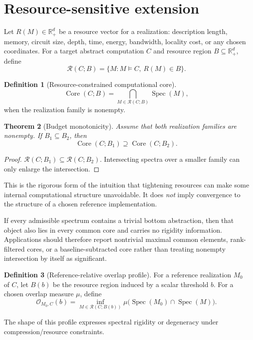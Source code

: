 \documentclass[11pt,a4paper]{article}
\theoremstyle{clean}
\newtheorem{theorem}{Theorem}[section]
\theoremstyle{definition}
\newtheorem{definition}[theorem]{Definition}
\newcommand{\Spec}{\operatorname{Spec}}
\newcommand{\Core}{\operatorname{Core}}
\begin{document}
\section{Resource-sensitive extension}

Let $R(M)\in\mathbb R_+^d$ be a resource vector for a realization: description length, memory, circuit size, depth, time, energy, bandwidth, locality cost, or any chosen coordinates. For a target abstract computation $C$ and resource region $B\subseteq\mathbb R_+^d$, define
\[
\mathcal R(C;B)=\{M: M\models C,\ R(M)\in B\}.
\]

\begin{definition}[Resource-constrained computational core]
\[
\Core(C;B)=\bigcap_{M\in\mathcal R(C;B)}\Spec(M),
\]
when the realization family is nonempty.
\end{definition}

\begin{theorem}[Budget monotonicity]
Assume that both realization families are nonempty. If $B_1\subseteq B_2$, then
\[
\Core(C;B_1)\supseteq\Core(C;B_2).
\]
\end{theorem}
\begin{proof}
$\mathcal R(C;B_1)\subseteq\mathcal R(C;B_2)$. Intersecting spectra over a smaller family can only enlarge the intersection.
\end{proof}

This is the rigorous form of the intuition that tightening resources can make some internal computational structure unavoidable. It does \emph{not} imply convergence to the structure of a chosen reference implementation.

If every admissible spectrum contains a trivial bottom abstraction, then that object also lies in every common core and carries no rigidity information. Applications should therefore report nontrivial maximal common elements, rank-filtered cores, or a baseline-subtracted core rather than treating nonempty intersection by itself as significant.

\begin{definition}[Reference-relative overlap profile]
For a reference realization $M_0$ of $C$, let $B(b)$ be the resource region induced by a scalar threshold $b$. For a chosen overlap measure $\mu$, define
\[
\mathcal O_{M_0,C}(b)=\inf_{M\in\mathcal R(C;B(b))}\mu\bigl(\Spec(M_0)\cap\Spec(M)\bigr).
\]
\end{definition}

The shape of this profile expresses spectral rigidity or degeneracy under compression/resource constraints.
\end{document}

